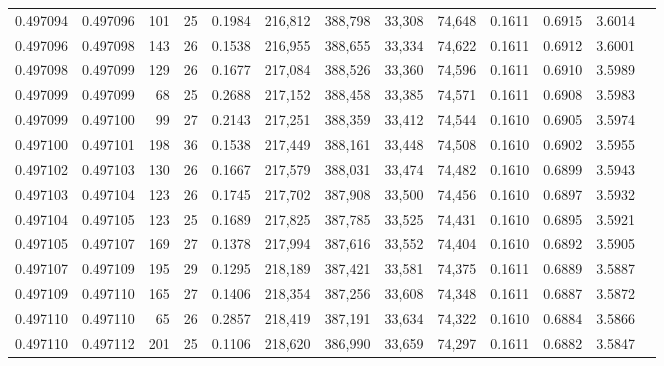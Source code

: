 \begin{tabular}{rrrrrrrrrrrrr}
0.497094 & 0.497096 & 101 &  25 &                                     0.1984 & 216,812 & 388,798 &  33,308 &  74,648 & 0.1611 & 0.6915 & 3.6014 \\
0.497096 & 0.497098 & 143 &  26 &                                     0.1538 & 216,955 & 388,655 &  33,334 &  74,622 & 0.1611 & 0.6912 & 3.6001 \\
0.497098 & 0.497099 & 129 &  26 &                                     0.1677 & 217,084 & 388,526 &  33,360 &  74,596 & 0.1611 & 0.6910 & 3.5989 \\
0.497099 & 0.497099 &  68 &  25 &                                     0.2688 & 217,152 & 388,458 &  33,385 &  74,571 & 0.1611 & 0.6908 & 3.5983 \\
0.497099 & 0.497100 &  99 &  27 &                                     0.2143 & 217,251 & 388,359 &  33,412 &  74,544 & 0.1610 & 0.6905 & 3.5974 \\
0.497100 & 0.497101 & 198 &  36 &                                     0.1538 & 217,449 & 388,161 &  33,448 &  74,508 & 0.1610 & 0.6902 & 3.5955 \\
0.497102 & 0.497103 & 130 &  26 &                                     0.1667 & 217,579 & 388,031 &  33,474 &  74,482 & 0.1610 & 0.6899 & 3.5943 \\
0.497103 & 0.497104 & 123 &  26 &                                     0.1745 & 217,702 & 387,908 &  33,500 &  74,456 & 0.1610 & 0.6897 & 3.5932 \\
0.497104 & 0.497105 & 123 &  25 &                                     0.1689 & 217,825 & 387,785 &  33,525 &  74,431 & 0.1610 & 0.6895 & 3.5921 \\
0.497105 & 0.497107 & 169 &  27 &                                     0.1378 & 217,994 & 387,616 &  33,552 &  74,404 & 0.1610 & 0.6892 & 3.5905 \\
0.497107 & 0.497109 & 195 &  29 &                                     0.1295 & 218,189 & 387,421 &  33,581 &  74,375 & 0.1611 & 0.6889 & 3.5887 \\
0.497109 & 0.497110 & 165 &  27 &                                     0.1406 & 218,354 & 387,256 &  33,608 &  74,348 & 0.1611 & 0.6887 & 3.5872 \\
0.497110 & 0.497110 &  65 &  26 &                                     0.2857 & 218,419 & 387,191 &  33,634 &  74,322 & 0.1610 & 0.6884 & 3.5866 \\
0.497110 & 0.497112 & 201 &  25 &                                     0.1106 & 218,620 & 386,990 &  33,659 &  74,297 & 0.1611 & 0.6882 & 3.5847 \\

\end{tabular}
